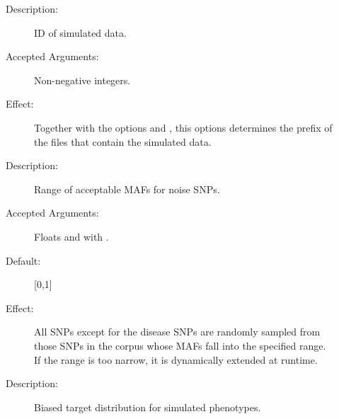 \documentclass[a4paper,10pt,english]{sphinxhowto}
\begin{document}
\begin{description}
\begin{description}
\item[{}] \leavevmode\begin{description}
\item[{Description:}] \leavevmode
ID of simulated data.

\item[{Accepted Arguments:}] \leavevmode
Non-negative integers.

\item[{Effect:}] \leavevmode
Together with the options  and , this options determines the prefix 
of the files that contain the simulated data.

\end{description}

\end{description}

\item[{\sphinxstylestrong{Optional Arguments:}}] \leavevmode\begin{description}
\item[{}] \leavevmode\begin{description}
\item[{Description:}] \leavevmode
Range of acceptable MAFs for noise SNPs.

\item[{Accepted Arguments:}] \leavevmode
Floats  and  with .

\item[{Default:}] \leavevmode
{[}0,1{]}

\item[{Effect:}] \leavevmode
All SNPs except for the disease SNPs are randomly sampled from those SNPs in the corpus whose MAFs
fall into the specified range. If the range is too narrow, it is dynamically extended at runtime.

\end{description}

\item[{}] \leavevmode\begin{description}
\item[{Description:}] \leavevmode
Biased target distribution for simulated phenotypes.


\end{description}
\end{description}
\end{description}
\end{document}
